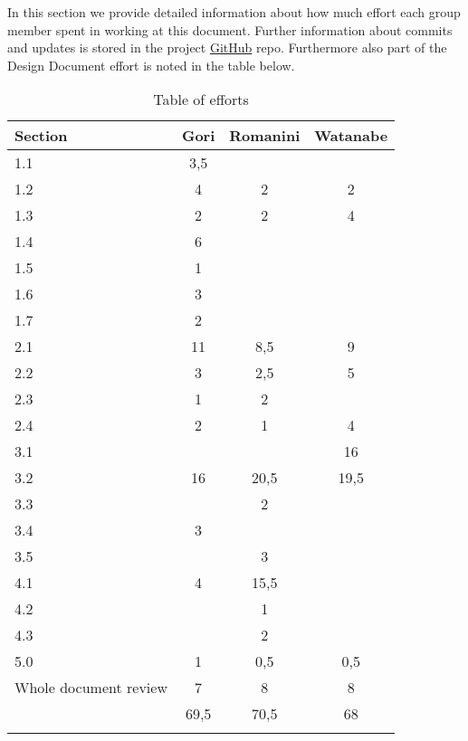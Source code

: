In this section we provide detailed information about how much effort each group member spent in working at this document. Further information about commits and updates is stored in the project \href{https://github.com/MarcoRomanini/GoriRomaniniWatanabe}{GitHub} repo. Furthermore also part of the Design Document effort is noted in the table below. 



\begin{center}
    \setlength\arrayrulewidth{1pt}
    \begin{longtable}{lccc}
        
        \hline
        \rowcolor{myblue}\color{white}Section & \color{white}Gori & \color{white}Romanini & \color{white}Watanabe \\
        \hline
        1.1	&	3,5	&		&		\\
        \hline
        1.2	&	4	&	2	&	2	\\
        \hline
        1.3	&	2	&	2	&	4	\\
        \hline
        1.4	&	6	&		&		\\
        \hline
        1.5	&	1	&		&		\\
        \hline
        1.6	&	3	&		&		\\
        \hline
        1.7	&	2	&		&		\\
        \hline
        2.1	&	11	&	8,5	&	9	\\
        \hline
        2.2	&	3	&	2,5	&	5	\\
        \hline
        2.3	&	1	&	2	&		\\
        \hline
        2.4	&	2	&	1	&	4	\\
        \hline
        3.1	&		&		&	16	\\
        \hline
        3.2	&	16	&	20,5	&	19,5	\\
        \hline
        3.3	&		&	2	&		\\
        \hline
        3.4	&	3	&		&		\\
        \hline
        3.5	&		&	3	&		\\
        \hline
        4.1	&	4	&	15,5	&		\\
        \hline
        4.2	&		&	1	&		\\
        \hline
        4.3	&		&	2	&		\\
        \hline
        5.0	&	1	&	0,5	&	0,5	\\
        \hline
        Whole document review 	&	7	&	8	&	8	\\
        \hline
        &	69,5	&	70,5	&	68	\\
        \hline
        
        \rowcolor{white}\caption{\label{tab:effort}Table of efforts}
        
    \end{longtable}
\end{center}